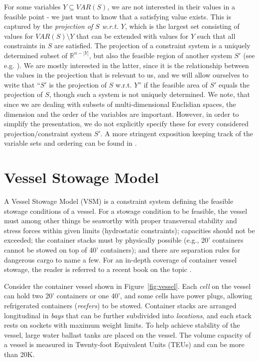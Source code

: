 \documentclass{llncs}
\newcommand{\VAR}{\mathit{VAR}}
\begin{document}
For some variables $Y\subseteq \VAR(S)$, we are not interested in their values in a feasible point - we just want to know that a satisfying value exists. This is captured by the \emph{projection of $S$ w.r.t. $Y$}, which is the largest set consisting of values for $\VAR(S)\setminus Y$ that can be extended with values for $Y$ such that all constraints in $S$ are satisfied. 
%
The projection of a constraint system is a uniquely determined subset of $\mathbb{R}^{n-|Y|}$, but also the feasible region of another system $S'$ (see e.g. \cite{ziegler95}). We are mostly interested in the latter, since it is the relationship between the values in the projection that is relevant to us, and we will allow ourselves to write that ``$S'$ is the projection of $S$ w.r.t. $Y$'' if the feasible area of $S'$ equals the projection of $S$, though such a system is not uniquely determined.
We note, that since we are dealing with subsets of multi-dimensional Euclidian spaces, the dimension and the order of the variables are important. However, in order to simplify the presentation, we do not explicitly specify these for every considered projection/constraint system $S'$. A more stringent exposition keeping track of the variable sets and ordering can be found in \cite{mytechrep}.

\section{Vessel Stowage Model}\label{sec:model}
A Vessel Stowage Model (VSM) is a constraint system defining the feasible stowage conditions of a vessel. For a stowage condition to be feasible, the vessel must among other things be seaworthy with proper transversal stability and stress forces within given limits (hydrostatic constraints); capacities should not be exceeded; the container stacks must by physically possible (e.g., 20' containers cannot be stowed on top of 40' containers); and there are separation rules for dangerous cargo to name a few. For an in-depth coverage of container vessel stowage, the reader is referred to a recent book on the topic \cite{JPAV18}.     

Consider the container vessel shown in Figure~\ref{fig:vessel}. Each \emph{cell} on the vessel can hold two 20' containers or one 40', and some cells have power plugs, allowing refrigerated containers (\emph{reefers}) to be stowed. Container stacks are arranged longitudinal in \emph{bays} that can be further subdivided into \emph{locations}, and each stack rests on sockets with maximum weight limits. To help achieve stability of the vessel, large water ballast tanks are placed on the vessel.
The volume capacity of a vessel is measured in Twenty-foot Equivalent Units (TEUs) and can be more than 20K. 
\end{document}
